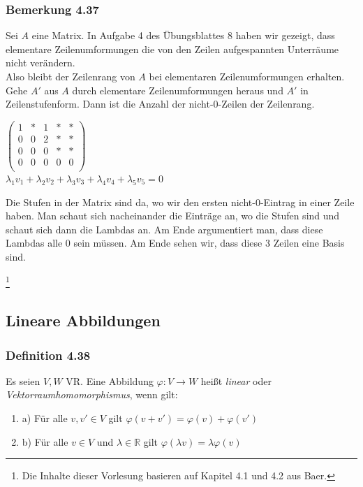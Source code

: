 \documentclass{article}
\begin{document}
\subsubsection*{Bemerkung 4.37}
Sei $A$ eine Matrix. In Aufgabe 4 des Übungsblattes 8 haben wir gezeigt, dass elementare Zeilenumformungen die von den Zeilen aufgespannten Unterräume nicht verändern. \\
Also bleibt der Zeilenrang von $A$ bei elementaren Zeilenumformungen erhalten. \\
Gehe $A'$ aus $A$ durch elementare Zeilenumformungen heraus und $A'$ in Zeilenstufenform. Dann ist die Anzahl der nicht-0-Zeilen der Zeilenrang. \\
\begin{center}
    $\begin{pmatrix}
        1 & * & 1 & * & * \\
        0 & 0 & 2 & * & * \\
        0 & 0 & 0 & * & * \\
        0 & 0 & 0 & 0 & 0 \\
    \end{pmatrix}$ \\
    $\lambda_1 v_1 + \lambda_2 v_2 + \lambda_3 v_3 + \lambda_4 v_4 + \lambda_5 v_5 = 0$ \\
\end{center}
Die Stufen in der Matrix sind da, wo wir den ersten nicht-0-Eintrag in einer Zeile haben. Man schaut sich nacheinander die Einträge an, wo die Stufen sind und schaut sich dann die Lambdas an. Am Ende argumentiert man, dass diese Lambdas alle 0 sein müssen. Am Ende sehen wir, dass diese 3 Zeilen eine Basis sind. \\

\newpage
\date{Donnerstag, 18.01.24} \footnote[1]{Die Inhalte dieser Vorlesung basieren auf Kapitel 4.1 und 4.2 aus Baer.}
\subsection{Lineare Abbildungen}

\subsubsection*{Definition 4.38}
Es seien $V, W$ VR. Eine Abbildung $\varphi: V \rightarrow W$ heißt \textit{linear} oder \textit{Vektorraumhomomorphismus}, wenn gilt: \\
\begin{enumerate}
    \item a) Für alle $v, v' \in V$ gilt $\varphi(v + v') = \varphi(v) + \varphi(v')$ \\
    \item b) Für alle $v \in V$ und $\lambda \in \mathbb{R}$ gilt $\varphi(\lambda v) = \lambda \varphi(v)$ \\
\end{enumerate}
\end{document}
